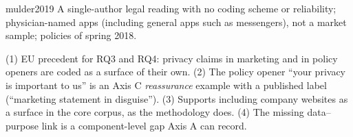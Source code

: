 \begin{papercard}{mulder2019}
 A single-author legal reading with no coding scheme or reliability; physician-named apps (including general apps such as messengers), not a market sample; policies of spring 2018.

 (1) EU precedent for RQ3 and RQ4: privacy claims in marketing and in policy openers are coded as a surface of their own. (2) The policy opener ``your privacy is important to us'' is an Axis C \emph{reassurance} example with a published label (``marketing statement in disguise''). (3) Supports including company websites as a surface in the core corpus, as the methodology does. (4) The missing data--purpose link is a component-level gap Axis A can record.
\end{papercard}
